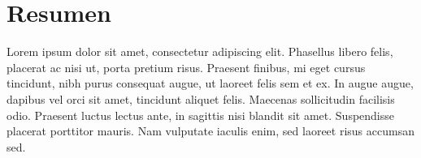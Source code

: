 \section*{Resumen}

Lorem ipsum dolor sit amet, consectetur adipiscing elit. Phasellus libero felis, placerat ac nisi ut, porta pretium risus. Praesent finibus, mi eget cursus tincidunt, nibh purus consequat augue, ut laoreet felis sem et ex. In augue augue, dapibus vel orci sit amet, tincidunt aliquet felis. Maecenas sollicitudin facilisis odio. Praesent luctus lectus ante, in sagittis nisi blandit sit amet. Suspendisse placerat porttitor mauris. Nam vulputate iaculis enim, sed laoreet risus accumsan sed.


